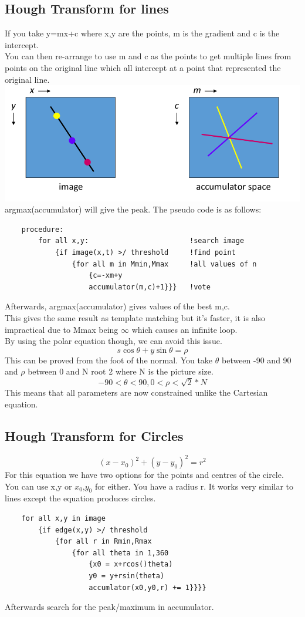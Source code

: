 \documentclass{article}
\begin{document}
	\subsection{Hough Transform for lines}
	If you take y=mx+c where x,y are the points, m is the gradient and c is the intercept.\\
	You can then re-arrange to use m and c as the points to get multiple lines from points on the original line which all intercept at a point that represented the original line.\\
	\includegraphics[scale=0.39]{houghtransform}
	\\
	argmax(accumulator) will give the peak. The pseudo code is as follows:
	\begin{verbatim}
	procedure:
	    for all x,y:                        !search image
	        {if image(x,t) >/ threshold     !find point
	            {for all m in Mmin,Mmax     !all values of n
	                {c=-xm+y
	                accumulator(m,c)+1}}}   !vote
	\end{verbatim}
	Afterwards, argmax(accumulator) gives values of the best m,c.\\
	This gives the same result as template matching but it's faster, it is also impractical due to Mmax being $\infty$ which causes an infinite loop.\\
	By using the polar equation though, we can avoid this issue.$$s\cos\theta + y\sin\theta = \rho$$
	This can be proved from the foot of the normal. You take $\theta$ between -90 and 90 and $\rho$ between 0 and N root 2 where N is the picture size.
	$$-90<\theta<90, 0<\rho<\sqrt{2}*N$$
	This means that all parameters are now constrained unlike the Cartesian equation.
	\subsection{Hough Transform for Circles}
	$$(x-x_0)^2+(y-y_0)^2=r^2$$
	For this equation we have two options for the points and centres of the circle. You can use x,y or $x_0$,$y_0$ for either. You have a radius r. It works very similar to lines except the equation produces circles.
	\begin{verbatim}
	for all x,y in image
	    {if edge(x,y) >/ threshold
	        {for all r in Rmin,Rmax
	            {for all theta in 1,360
	                {x0 = x+rcos()theta)
	                y0 = y+rsin(theta)
	                accumlator(x0,y0,r) += 1}}}}
	\end{verbatim}
	Afterwards search for the peak/maximum in accumulator.
\end{document}
